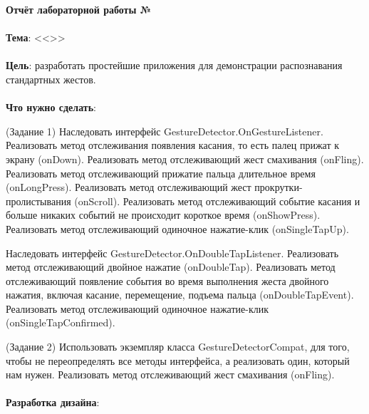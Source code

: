 \documentclass[12pt, a4paper, simple]{eskdtext}
\def \gpiDocTopic {Отчёт лабораторной работы №\gpiDocNum}
\begin{document}
    
    \begin{center}
        \textbf{\gpiDocTopic}
    \end{center}

    \paragraph{} \textbf{Тема}: <<\gpiTopicRep>>

    \paragraph{} \textbf{Цель}: разработать простейшие приложения для демонстрации распознавания стандартных жестов.

    \paragraph{} \textbf{Что нужно сделать}:

    (Задание 1) Наследовать интерфейс GestureDetector.OnGestureListener.
    Реализовать метод отслеживания появления касания, то есть палец прижат к экрану (onDown).
    Реализовать метод отслеживающий жест смахивания (onFling).
    Реализовать метод отслеживающий прижатие пальца длительное время (onLongPress).
    Реализовать метод отслеживающий жест прокрутки-пролистывания (onScroll).
    Реализовать метод отслеживающий событие касания и больше никаких событий не происходит короткое время (onShowPress).
    Реализовать метод отслеживающий одиночное нажатие-клик (onSingleTapUp).
    
    Наследовать интерфейс GestureDetector.OnDoubleTapListener.
    Реализовать метод отслеживающий двойное нажатие (onDoubleTap).
    Реализовать метод отслеживающий появление события во время выполнения жеста двойного нажатия,
    включая касание, перемещение, подъема пальца (onDoubleTapEvent).
    Реализовать метод отслеживающий одиночное нажатие-клик (onSingleTapConfirmed).
    
    (Задание 2) Использовать экземпляр класса GestureDetectorCompat, для того, чтобы не переопределять все методы интерфейса,
    а реализовать один, который нам нужен. Реализовать метод отслеживающий жест смахивания (onFling).

    \paragraph{} \textbf{Разработка дизайна}:
\end{document}
